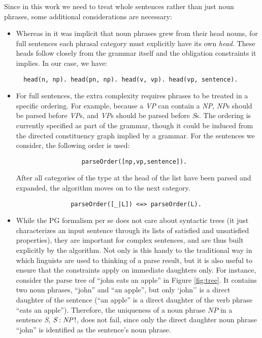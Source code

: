 \documentclass{llncs}
\newcommand{\uniqueness}[2]{\textit{#1} : \textit{#2}\,!}
\newcommand{\NP}{\textit{NP}\xspace}
\newcommand{\VP}{\textit{VP}\xspace}
\newcommand{\Se}{\textit{S}\xspace}
\begin{document}
Since in this work we need to treat whole sentences rather than just noun phrases, some additional considerations are necessary:
\begin{itemize}
  \item Whereas in \cite {DM12} it was implicit that noun phrases grew from their head nouns, for full sentences each phrasal category must explicitly have its own \emph{head}. These heads follow closely from the grammar itself and the obligation constraints it implies. In our case, we have:
\begin{verbatim}  head(n, np). head(pn, np). head(v, vp). head(vp, sentence).\end{verbatim}
  
  \item For full sentences, the extra complexity requires phrases to be treated in a specific ordering. For example, because a \VP can contain a \NP, \NP{}s should be parsed before \VP{}s, and \VP{}s should be parsed before \Se{}s. The ordering is currently specified as part of the grammar, though it could be induced from the directed constituency graph implied by a grammar. For the sentences we consider, the following order is used:
\begin{verbatim}                  parseOrder([np,vp,sentence]).\end{verbatim}

After all categories of the type at the head of the list have been parsed and expanded, the algorithm moves on to the next category.
\begin{verbatim}               parseOrder([_|L]) <=> parseOrder(L).
\end{verbatim}
  
  \item While the PG formalism per se does not care about syntactic trees (it just characterizes an input sentence through its lists of satisfied and unsatisfied properties), they are important for complex sentences, and are thus built explicitly by the algorithm. Not only is this handy to the traditional way in which linguists are used to thinking of a parse result, but it is also useful to ensure that the constraints apply on immediate daughters only. For instance, consider the parse tree of ``john eats an apple'' in Figure \ref{fig:tree}. It contains two noun phrases, ``john'' and ``an apple'', but only `john'' is a direct daughter of the sentence (``an apple'' is a direct daughter of the verb phrase ``eats an apple''). Therefore, the uniqueness of a noun phrase $\NP$ in a sentence \Se, $\uniqueness{\Se}{\NP}$, does not fail, since only the direct daughter noun phrase ``john'' is identified as the sentence's noun phrase.


\end{itemize}
\end{document}
